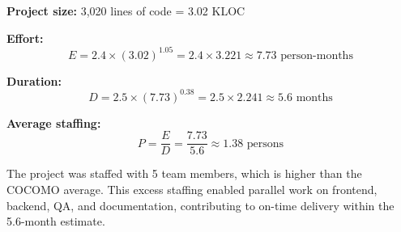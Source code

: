 \documentclass[12pt,a4paper]{report}
\begin{document}
\textbf{Project size:} 3,020 lines of code = 3.02 KLOC

\textbf{Effort:}
\[
  E = 2.4 \times (3.02)^{1.05}
    = 2.4 \times 3.221
    \approx \mathbf{7.73} \text{ person-months}
\]

\textbf{Duration:}
\[
  D = 2.5 \times (7.73)^{0.38}
    = 2.5 \times 2.241
    \approx \mathbf{5.6} \text{ months}
\]

\textbf{Average staffing:}
\[
  P = \frac{E}{D} = \frac{7.73}{5.6} \approx \mathbf{1.38} \text{ persons}
\]

The project was staffed with 5 team members, which is higher than the COCOMO average. This excess staffing enabled parallel work on frontend, backend, QA, and documentation, contributing to on-time delivery within the 5.6-month estimate.
\end{document}
